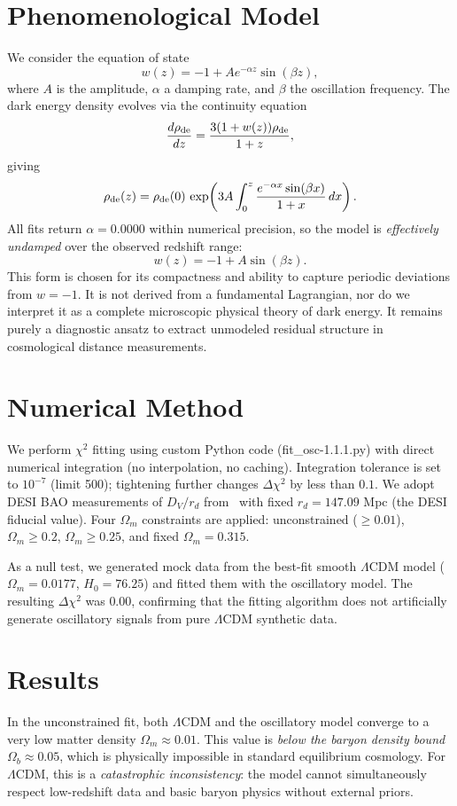 \documentclass[10pt,a4paper,twocolumn]{article}
\begin{document}
\section{Phenomenological Model}
We consider the equation of state
\[
w(z) = -1 + A e^{-\alpha z}\sin(\beta z),
\]
where $A$ is the amplitude, $\alpha$ a damping rate, and $\beta$ the oscillation frequency. The dark energy density evolves via the continuity equation
\[
\frac{d\rho_{\rm de}}{dz} = \frac{3(1+w(z))\rho_{\rm de}}{1+z},
\]
giving
\[
\rho_{\rm de}(z) = \rho_{\rm de}(0)\,\exp\!\left(3A\int_0^z \frac{e^{-\alpha x}\sin(\beta x)}{1+x}\,dx\right).
\]
All fits return $\alpha=0.0000$ within numerical precision, so the model is \emph{effectively undamped} over the observed redshift range:
\[
w(z) = -1 + A\sin(\beta z).
\]
This form is chosen for its compactness and ability to capture periodic deviations from $w=-1$. It is not derived from a fundamental Lagrangian, nor do we interpret it as a complete microscopic physical theory of dark energy. It remains purely a diagnostic ansatz to extract unmodeled residual structure in cosmological distance measurements.

\section{Numerical Method}
We perform $\chi^2$ fitting using custom Python code (fit\_osc-1.1.1.py) with direct numerical integration (no interpolation, no caching). Integration tolerance is set to $10^{-7}$ (limit 500); tightening further changes $\Delta\chi^2$ by less than $0.1$. We adopt DESI BAO measurements of $D_V/r_d$ from~\cite{DESI2024} with fixed $r_d=147.09$ Mpc (the DESI fiducial value). Four $\Omega_m$ constraints are applied: unconstrained ($\ge0.01$), $\Omega_m\ge0.2$, $\Omega_m\ge0.25$, and fixed $\Omega_m=0.315$.

As a null test, we generated mock data from the best-fit smooth $\Lambda$CDM model ($\Omega_m=0.0177$, $H_0=76.25$) and fitted them with the oscillatory model. The resulting $\Delta\chi^2$ was $0.00$, confirming that the fitting algorithm does not artificially generate oscillatory signals from pure $\Lambda$CDM synthetic data.

\section{Results}

In the unconstrained fit, both $\Lambda$CDM and the oscillatory model converge to a very low matter density $\Omega_m \approx 0.01$.
This value is \emph{below the baryon density bound} $\Omega_b \approx 0.05$, which is physically impossible in standard equilibrium cosmology.
For $\Lambda$CDM, this is a \emph{catastrophic inconsistency}: the model cannot simultaneously respect low-redshift data and basic baryon physics without external priors.
\end{document}
